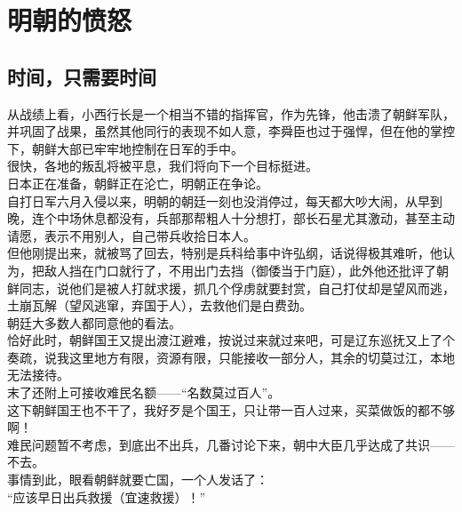 \section{明朝的愤怒}
\ifnum{}
	\begin{multicols}{\theparacolNo}
\fi
\subsection{时间，只需要时间}
从战绩上看，小西行长是一个相当不错的指挥官，作为先锋，他击溃了朝鲜军队，并巩固了战果，虽然其他同行的表现不如人意，李舜臣也过于强悍，但在他的掌控下，朝鲜大部已牢牢地控制在日军的手中。\\

很快，各地的叛乱将被平息，我们将向下一个目标挺进。\\

日本正在准备，朝鲜正在沦亡，明朝正在争论。\\

自打日军六月入侵以来，明朝的朝廷一刻也没消停过，每天都大吵大闹，从早到晚，连个中场休息都没有，兵部那帮粗人十分想打，部长石星尤其激动，甚至主动请愿，表示不用别人，自己带兵收拾日本人。\\

但他刚提出来，就被骂了回去，特别是兵科给事中许弘纲，话说得极其难听，他认为，把敌人挡在门口就行了，不用出门去挡（御倭当于门庭），此外他还批评了朝鲜同志，说他们是被人打就求援，抓几个俘虏就要封赏，自己打仗却是望风而逃，土崩瓦解（望风逃窜，弃国于人），去救他们是白费劲。\\

朝廷大多数人都同意他的看法。\\

恰好此时，朝鲜国王又提出渡江避难，按说过来就过来吧，可是辽东巡抚又上了个奏疏，说我这里地方有限，资源有限，只能接收一部分人，其余的切莫过江，本地无法接待。\\

末了还附上可接收难民名额——“名数莫过百人”。\\

这下朝鲜国王也不干了，我好歹是个国王，只让带一百人过来，买菜做饭的都不够啊！\\

难民问题暂不考虑，到底出不出兵，几番讨论下来，朝中大臣几乎达成了共识——不去。\\

事情到此，眼看朝鲜就要亡国，一个人发话了：\\

“应该早日出兵救援（宜速救援）！”\\


\end{multicols}
